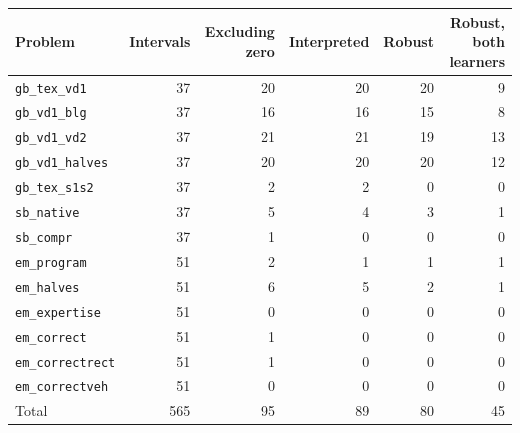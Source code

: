 \begin{tabular}{lrrrrr}
\toprule
Problem & Intervals & Excluding zero & Interpreted & Robust & Robust, both learners \\
\midrule
\texttt{gb\_tex\_vd1} & 37 & 20 & 20 & 20 & 9 \\
\texttt{gb\_vd1\_blg} & 37 & 16 & 16 & 15 & 8 \\
\texttt{gb\_vd1\_vd2} & 37 & 21 & 21 & 19 & 13 \\
\texttt{gb\_vd1\_halves} & 37 & 20 & 20 & 20 & 12 \\
\texttt{gb\_tex\_s1s2} & 37 & 2 & 2 & 0 & 0 \\
\texttt{sb\_native} & 37 & 5 & 4 & 3 & 1 \\
\texttt{sb\_compr} & 37 & 1 & 0 & 0 & 0 \\
\texttt{em\_program} & 51 & 2 & 1 & 1 & 1 \\
\texttt{em\_halves} & 51 & 6 & 5 & 2 & 1 \\
\texttt{em\_expertise} & 51 & 0 & 0 & 0 & 0 \\
\texttt{em\_correct} & 51 & 1 & 0 & 0 & 0 \\
\texttt{em\_correctrect} & 51 & 1 & 0 & 0 & 0 \\
\texttt{em\_correctveh} & 51 & 0 & 0 & 0 & 0 \\
\midrule
Total & 565 & 95 & 89 & 80 & 45 \\
\bottomrule
\end{tabular}
